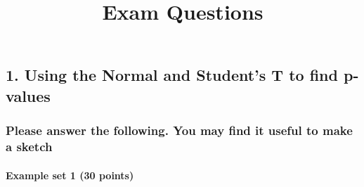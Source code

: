 \documentclass[]{article}
\title{Exam Questions}
\author{}
\date{}
\let\oldparagraph\paragraph
\renewcommand{\paragraph}[1]{\oldparagraph{#1}\mbox{}}
\begin{document}
\maketitle

\subsection{1. Using the Normal and Student's T to find
p-values}\label{using-the-normal-and-students-t-to-find-p-values}

\subsubsection{Please answer the following. You may find it useful to
make a
sketch}\label{please-answer-the-following.-you-may-find-it-useful-to-make-a-sketch}

\paragraph{Example set 1 (30 points)}\label{example-set-1-30-points}
\end{document}
